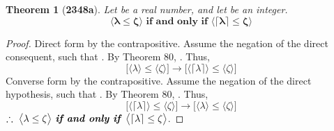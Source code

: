 \documentclass[preview]{standalone}
\newtheorem{theorem}{Theorem}
\begin{document}
\begin{theorem}[\textbf{2348a}]
    Let \bm{$\lambda$} be a real number, 
    and let \bm{$\zeta$} be an integer.
    \begin{equation*}
        \bm{
        \big \langle \lambda \le \zeta \big \rangle
            \textbf{ if and only if } 
        \big \langle \lceil \lambda \rceil \le \zeta \big \rangle
        }
    \end{equation*}
\end{theorem}

\begin{proof}
    Direct form by the contrapositive. 
    Assume the negation of the direct consequent,
    such that \bm{$\lceil \lambda \rceil > \zeta$}. 
    By Theorem 80, 
    \bm{$\lambda > \zeta$}.
    Thus,
    \begin{equation*}
        \bigg[
            \Big \langle \lambda \Big \rangle
                \leq 
            \Big \langle \zeta \Big \rangle
        \bigg]
            \rightarrow 
        \bigg[
            \Big \langle \lceil \lambda \rceil \Big \rangle
                \leq 
            \Big \langle \zeta \Big \rangle
        \bigg]
    \end{equation*}
    Converse form by the contrapositive. 
    Assume the negation of the direct hypothesis, 
    such that \bm{$\lambda > \zeta$}.
    By Theorem 80, \bm{$\lceil \lambda \rceil > \zeta$}. 
    Thus,
    \begin{equation*}
        \bigg[
            \Big \langle \lceil \lambda \rceil \Big \rangle
                \leq 
            \Big \langle \zeta \Big \rangle
        \bigg]
            \rightarrow 
        \bigg[
            \Big \langle \lambda \Big \rangle
                \leq 
            \Big \langle \zeta \Big \rangle
        \bigg]
    \end{equation*}
    $\therefore \text{\space} \relax{
        \big \langle \lambda \le \zeta \big \rangle
            \textbf{ \emph{if and only if} } 
        \big \langle \lceil \lambda \rceil \le \zeta \big \rangle}
    $.
\end{proof}
\end{document}
